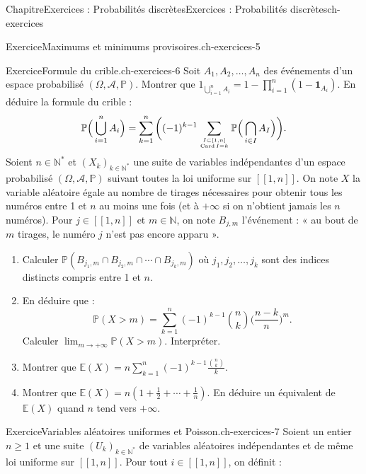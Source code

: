 \documentclass[twoside,10pt,]{book}
\numberwithin{equation}{chapter}
\newcommand{\N}{\mathbb N}
\renewcommand{\Pr}{\mathbb P}
\newcommand{\Es}{\mathbb E}
\newcommand\card{\operatorname{Card}}
\renewcommand\llbracket{[\![}
\renewcommand\rrbracket{]\!]}
\newcommand{\gt}{>}
\begin{document}
\begin{chapterptx}{Chapitre}{Exercices : Probabilités discrètes}{}{Exercices : Probabilités discrètes}{}{}{ch-exercices}
\begin{inlineexercise}{Exercice}{Maximums et minimums provisoires.}{ch-exercices-5}
\end{inlineexercise}%
\begin{inlineexercise}{Exercice}{Formule du crible.}{ch-exercices-6}%
Soit \(A_{1}, A_{2}, \ldots, A_{n}\) des événements d'un espace probabilisé \((\Omega, \mathcal{A}, \Pr)\).%
Montrer que \(1_{\bigcup_{i=1}^{n} A_{i}} = 1 - \prod_{i=1}^{n} (1 - \mathbf{1}_{A_{i}})\). En déduire la formule du crible :%
\begin{equation*}
\Pr\Big(\bigcup_{i=1}^{n} A_{i}\Big) = \sum_{k=1}^{n} \bigg((-1)^{k-1} \sum_{I \subset [1, n] \atop \card I = k} \Pr\Big(\bigcap_{i \in I} A_{I}\Big)\bigg).
\end{equation*}
%
Soient \(n \in \N^{*}\) et \((X_{k})_{k \in \N^{*}}\) une suite de variables indépendantes d'un espace probabilisé \((\Omega, \mathcal{A}, \Pr)\) suivant toutes la loi uniforme sur \(\llbracket 1, n \rrbracket\). On note \(X\) la variable aléatoire égale au nombre de tirages nécessaires pour obtenir tous les numéros entre 1 et \(n\) au moins une fois (et à \(+\infty\) si on n'obtient jamais les \(n\) numéros). Pour \(j \in \llbracket 1, n \rrbracket\) et \(m \in \N\), on note \(B_{j, m}\) l'événement : « au bout de \(m\) tirages, le numéro \(j\) n'est pas encore apparu ».%
%
\begin{enumerate}[label={\arabic*.}]
\item{}Calculer \(\Pr(B_{j_{1}, m} \cap B_{j_{2}, m} \cap \cdots \cap B_{j_{k}, m})\) où \(j_{1}, j_{2}, \ldots, j_{k}\) sont des indices distincts compris entre 1 et \(n\).%
\item{}En déduire que :%
\begin{equation*}
\Pr(X \gt m) = \sum_{k=1}^{n} (-1)^{k-1} \binom{n}{k} \Big(\frac{n - k}{n}\Big)^{m}.
\end{equation*}
Calculer \(\lim_{m \rightarrow +\infty} \Pr(X \gt m)\). Interpréter.%
\item{}Montrer que \(\Es(X) = n \sum_{k=1}^{n} (-1)^{k-1} \frac{\binom{n}{k}}{k}\).%
\item{}Montrer que \(\Es(X) = n \left(1 + \frac{1}{2} + \cdots + \frac{1}{n}\right)\). En déduire un équivalent de \(\Es(X)\) quand \(n\) tend vers \(+\infty\).%
\end{enumerate}
\end{inlineexercise}%
\begin{inlineexercise}{Exercice}{Variables aléatoires uniformes et Poisson.}{ch-exercices-7}%
Soient un entier \(n \geqslant 1\) et une suite \((U_{k})_{k \in \N^{*}}\) de variables aléatoires indépendantes et de même loi uniforme sur \(\llbracket 1, n \rrbracket\). Pour tout \(i \in \llbracket 1, n \rrbracket\), on définit :%

\end{inlineexercise}
\end{chapterptx}
\end{document}
